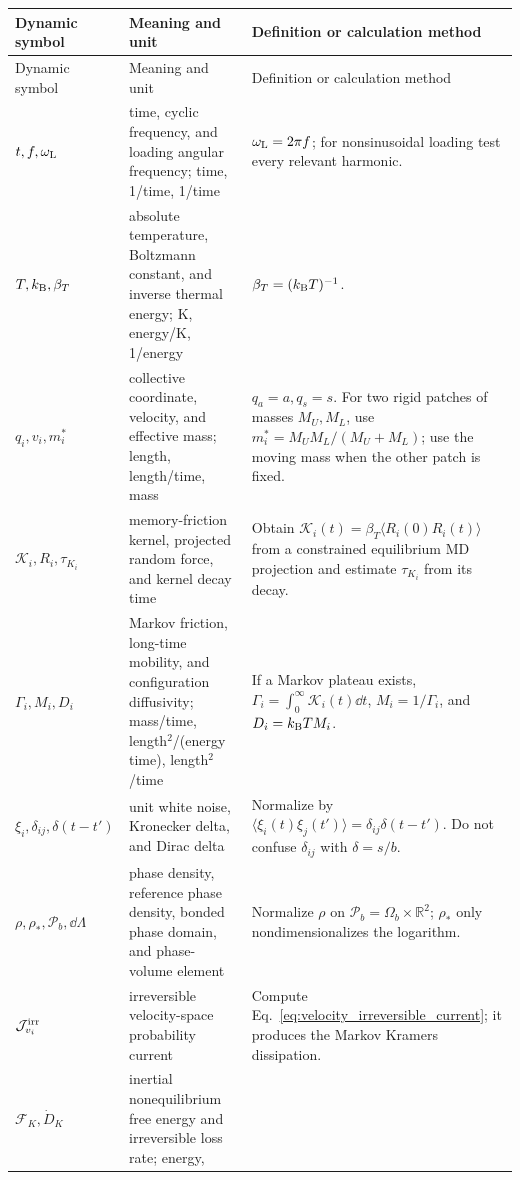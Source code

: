 \begin{longtable}{>{\raggedright\arraybackslash}p{}
                  >{\raggedright\arraybackslash}p{}
                  >{\raggedright\arraybackslash}p{}}
\toprule
Dynamic symbol & Meaning and unit & Definition or calculation method\\
\midrule
\endfirsthead
\toprule
Dynamic symbol & Meaning and unit & Definition or calculation method\\
\midrule
\endhead
\bottomrule
\endfoot
$t,f,\omega_{\rm L}$ & time, cyclic frequency, and loading angular frequency; time, 1/time, 1/time &
$\omega_{\rm L}=2\pi f$; for nonsinusoidal loading test every relevant harmonic.\\
$T,k_{\mathrm B},\beta_T$ & absolute temperature, Boltzmann constant, and inverse thermal energy; K,
energy/K, 1/energy & $\beta_T=(k_{\mathrm B} T)^{-1}$.\\
$q_i,v_i,m_i^*$ & collective coordinate, velocity, and effective mass; length, length/time, mass &
$q_a=a,q_s=s$. For two rigid patches of masses $M_U,M_L$, use
$m_i^*=M_UM_L/(M_U+M_L)$; use the moving mass when the other patch is fixed.\\
$\mathcal K_i,R_i,\tau_{K_i}$ & memory-friction kernel, projected random force, and kernel decay
time & Obtain $\mathcal K_i(t)=\beta_T\langle R_i(0)R_i(t)\rangle$ from a constrained equilibrium
MD projection and estimate $\tau_{K_i}$ from its decay.\\
$\Gamma_i,M_i,D_i$ & Markov friction, long-time mobility, and configuration diffusivity;
mass/time, length$^2$/(energy time), length$^2$/time & If a Markov plateau exists,
$\Gamma_i=\int_0^\infty\mathcal K_i(t)\dd t$, $M_i=1/\Gamma_i$, and $D_i=k_{\mathrm B} TM_i$.\\
$\xi_i,\delta_{ij},\delta(t-t')$ & unit white noise, Kronecker delta, and Dirac delta & Normalize by
$\langle\xi_i(t)\xi_j(t')\rangle=\delta_{ij}\delta(t-t')$. Do not confuse $\delta_{ij}$ with
$\delta=s/b$.\\
$\rho,\rho_*,\mathcal P_b,\dd\Lambda$ & phase density, reference phase density, bonded phase domain,
and phase-volume element & Normalize $\rho$ on $\mathcal P_b=\Omega_b\times\mathbb R^2$;
$\rho_*$ only nondimensionalizes the logarithm.\\
$\mathcal J_{v_i}^{\rm irr}$ & irreversible velocity-space probability current & Compute
Eq.~\eqref{eq:velocity_irreversible_current}; it produces the Markov Kramers dissipation.\\
$\mathcal F_K,\dot D_K$ & inertial nonequilibrium free energy and irreversible loss rate; energy,

\end{longtable}
